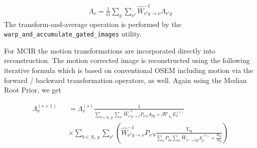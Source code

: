 \documentclass{article}
\begin{document}
\begin{equation}
\begin{array}{rrr}
\Lambda_{\nu}=\frac{1}{G}\sum\limits_{g}\sum\limits_{\nu'}\hat{W}^{-1} _{\nu'g\rightarrow \nu}\Lambda_{\nu'g}
\end{array}
\end{equation}
The transform-and-average operation is performed by the
\texttt{warp\_and\_accumulate\_gated\_images} utility.

For MCIR the motion transformations are incorporated directly into reconstruction. The motion corrected
image is reconstructed using the following iterative formula which is based on conventional OSEM
including motion via the forward / backward transformation operators, as well. Again using the Median Root Prior, we get

\begin{equation}
\begin{array}{lcl}
\Lambda_{\nu}^{(s+1)}&&=\Lambda_{\nu}^{(s)} \frac{1}{ \sum\limits_{b\in S_{l}, g} \sum\limits_{\nu'} \hat{W}^{-1} _{\nu'g\rightarrow \nu}P_{\nu' b}A_{bg}+\beta \nabla_{\Lambda_{\nu}} E_{\nu}^{(s)}}\\
&&\times \sum\limits_{b\in S_{l}, g} \sum\limits_{\nu'}\left(\hat{W}^{-1} _{\nu'g\rightarrow \nu}P_{\nu' b}\frac{Y_{bg}}{\sum\limits_{\tilde{\nu}}P_{b\tilde{\nu}}\sum\limits_{\tilde{\nu}'}\hat{W} _{\tilde{\nu}'\rightarrow \tilde{\nu}g}\Lambda_{\tilde{\nu}'}^{(s)}+\frac{B_{bg}}{A_{bg}}}\right)
\end{array}
\end{equation}
\end{document}
